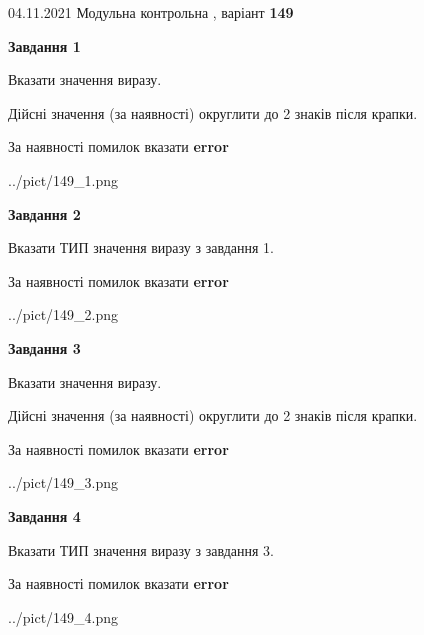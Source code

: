 \documentclass[11pt, ukrainian]{article}
\begin{document}
{04.11.2021 Модульна контрольна , варіант  \No \textbf { 149 }\par}
{
\begin {large}
{\begin {center}\textbf{Завдання 1}\end {center}}\par
Вказати значення виразу. \par
Дійсні значення (за наявності) округлити до 2 знаків після крапки. \par
За наявності помилок вказати \textbf{error}

\begin{center}
	{../pict/149_1.png}
\end{center}
\newpage

{\begin {center}\textbf{Завдання 2}\end {center}}\par
Вказати ТИП значення виразу з завдання 1. \par
За наявності помилок вказати \textbf{error}

\begin{center}
	{../pict/149_2.png}
\end{center}
\newpage

{\begin {center}\textbf{Завдання 3}\end {center}}\par
Вказати значення виразу. \par
Дійсні значення (за наявності) округлити до 2 знаків після крапки. \par
За наявності помилок вказати \textbf{error}

\begin{center}
	{../pict/149_3.png}
\end{center}
\newpage

{\begin {center}\textbf{Завдання 4}\end {center}}\par
Вказати ТИП значення виразу з завдання 3. \par
За наявності помилок вказати \textbf{error}

\begin{center}
	{../pict/149_4.png}
\end{center}
\newpage


\end{large}}
\end{document}
